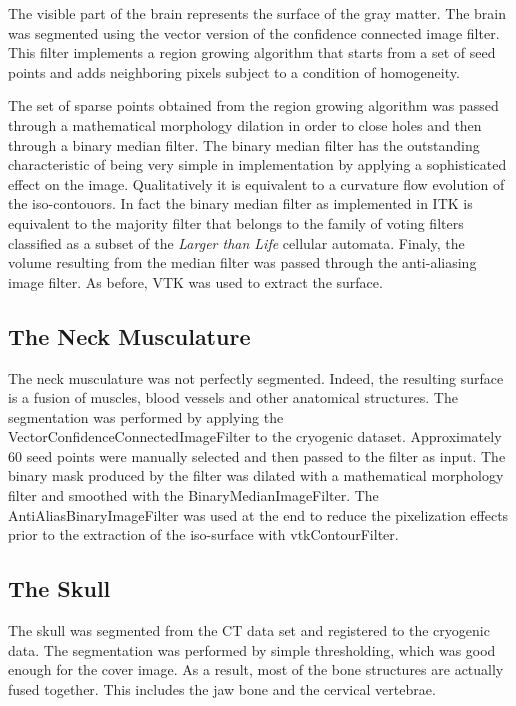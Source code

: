 The visible part of the brain represents the surface of the gray matter.  The
brain was segmented using the vector version of the confidence connected
image filter.  This filter implements a region growing algorithm that starts
from a set of seed points and adds neighboring pixels subject to a condition
of homogeneity.

The set of sparse points obtained from the region growing algorithm was
passed through a mathematical morphology dilation in order to close holes and
then through a binary median filter. The binary median filter has the
outstanding characteristic of being very simple in implementation by applying
a sophisticated effect on the image. Qualitatively it is equivalent to a
curvature flow evolution of the iso-contouors. In fact the binary median
filter as implemented in ITK is equivalent to the majority filter that
belongs to the family of voting filters classified as a subset of the
\emph{Larger than Life} cellular automata. Finaly, the volume resulting from
the median filter was passed through the anti-aliasing image filter. As
before, VTK was used to extract the surface.

\subsection*{The Neck Musculature}

The neck musculature was not perfectly segmented. Indeed, the resulting
surface is a fusion of muscles, blood vessels and other anatomical
structures. The segmentation was performed by applying the
VectorConfidenceConnectedImageFilter to the cryogenic dataset.  Approximately
60 seed points were manually selected and then passed to the filter as
input. The binary mask produced by the filter was dilated with a mathematical
morphology filter and smoothed with the BinaryMedianImageFilter. The
AntiAliasBinaryImageFilter was used at the end to reduce the pixelization
effects prior to the extraction of the iso-surface with vtkContourFilter.

\subsection*{The Skull}

The skull was segmented from the CT data set and registered to the cryogenic
data. The segmentation was performed by simple thresholding, which was good
enough for the cover image. As a result, most of the bone structures are
actually fused together. This includes the jaw bone and the cervical
vertebrae.

